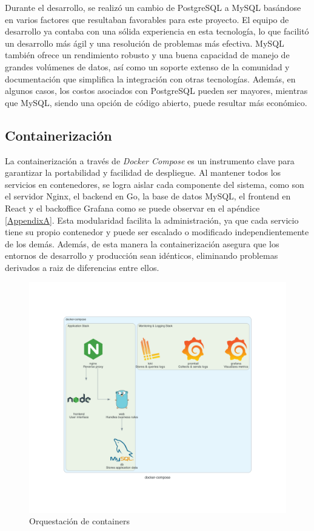{Durante el desarrollo, se realizó un cambio de PostgreSQL a MySQL basándose en varios factores que resultaban favorables para este proyecto. El equipo de desarrollo ya contaba con una sólida experiencia en esta tecnología, lo que facilitó un desarrollo más ágil y una resolución de problemas más efectiva. MySQL también ofrece un rendimiento robusto y una buena capacidad de manejo de grandes volúmenes de datos, así como un soporte extenso de la comunidad y documentación que simplifica la integración con otras tecnologías. Además, en algunos casos, los costos asociados con PostgreSQL pueden ser mayores, mientras que MySQL, siendo una opción de código abierto, puede resultar más económico.

\subsection{Containerización}

La containerización a través de \textit{Docker Compose} es un instrumento clave para garantizar la portabilidad y facilidad de despliegue. Al mantener todos los servicios en contenedores, se logra aislar cada componente del sistema, como son el servidor Nginx, el backend en Go, la base de datos MySQL, el frontend en React y el backoffice Grafana como se puede observar en el apéndice \ref{AppendixA}. Esta modularidad facilita la administración, ya que cada servicio tiene su propio contenedor y puede ser escalado o modificado independientemente de los demás. Además, de esta manera la containerización asegura que los entornos de desarrollo y producción sean idénticos, eliminando problemas derivados a raiz de diferencias entre ellos. 

\begin{figure}[H]
	\centering
	\includegraphics[scale=.29]{./Figures/PortalWeb/docker-compose.png}
	\caption{Orquestación de containers}
	\label{fig:docker-compose}
\end{figure}

}
